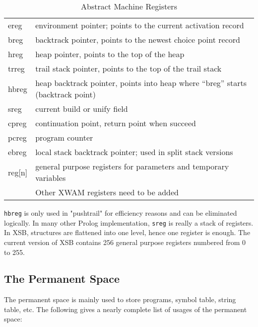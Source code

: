 \documentclass[11pt]{article}
\begin{document}
\begin{table}\centering
\begin{tabular}{|l|l|}
\hline
 ereg	& environment pointer; points to the current activation record	\\
 breg	& backtrack pointer, points to the newest choice point record	\\
 hreg	& heap pointer, points to the top of the heap			\\
 trreg	& trail stack pointer, points to the top of the trail stack	\\
 hbreg	& heap backtrack pointer, points into heap where ``breg'' starts
                                                (backtrack point)	\\
 sreg	& current build or unify field					\\
 cpreg	& continuation point, return point when succeed			\\
 pcreg	& program counter						\\
 ebreg  & local stack backtrack pointer; used in split stack versions   \\
 reg[n]	& general purpose registers for parameters and temporary variables \\
\hline
	& Other XWAM registers need to be added	                         \\
\hline
\end{tabular}
\caption{Abstract Machine Registers}
\label{t:register}
\end{table}

{\tt hbreg} is only used in "pushtrail" for efficiency reasons and can
be eliminated logically. In many other Prolog implementation,
{\tt sreg} is really a stack of registers. In XSB, structures
are flattened into one level, hence one register is enough.
The current version of XSB contains 256 general purpose registers
numbered from 0 to 255.


\subsection{The Permanent Space}

The permanent space is mainly used to store programs, symbol table, string
table, etc. The following gives a nearly complete list of usages
of the permanent space:
\end{document}
